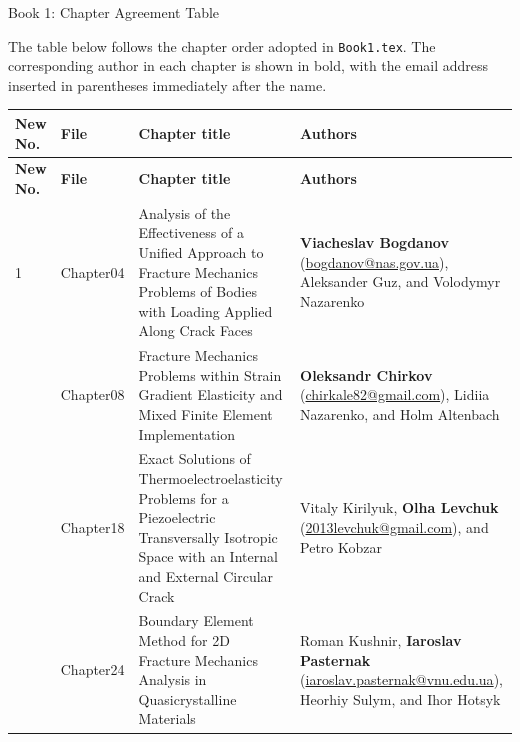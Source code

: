 \documentclass[12pt,a4paper]{article}
\begin{document}
	
	\begin{center}
		{\LARGE Book 1: Chapter Agreement Table}
	\end{center}
	
	\bigskip
	
	\noindent
	The table below follows the chapter order adopted in \texttt{Book1.tex}. The corresponding author in each chapter is shown in bold, with the email address inserted in parentheses immediately after the name.
	
	\renewcommand{\arraystretch}{1.5}
	\setlength{\LTleft}{0pt}
	\setlength{\LTright}{0pt}
	
	\begin{longtable}{>{\RaggedRight\arraybackslash}p{1.1cm} >{\RaggedRight\arraybackslash}p{1.8cm} >{\RaggedRight\arraybackslash}p{6.4cm} >{\RaggedRight\arraybackslash}p{5.9cm}}
		\toprule
		\textbf{New No.} & \textbf{File} & \textbf{Chapter title} & \textbf{Authors} \\
		\midrule
		\endfirsthead
		
		\toprule
		\textbf{New No.} & \textbf{File} & \textbf{Chapter title} & \textbf{Authors} \\
		\midrule
		\endhead
		
		\bottomrule
		\endfoot
		
		1 & Chapter04 & Analysis of the Effectiveness of a Unified Approach to Fracture Mechanics Problems of Bodies with Loading Applied Along Crack Faces & \textbf{Viacheslav Bogdanov} (\href{mailto:bogdanov@nas.gov.ua}{bogdanov@nas.gov.ua}), Aleksander Guz, and Volodymyr Nazarenko \\
		
		2 & Chapter08 & Fracture Mechanics Problems within Strain Gradient Elasticity and Mixed Finite Element Implementation & \textbf{Oleksandr Chirkov} (\href{mailto:chirkale82@gmail.com}{chirkale82@gmail.com}), Lidiia Nazarenko, and Holm Altenbach \\
		
		3 & Chapter18 & Exact Solutions of Thermoelectroelasticity Problems for a Piezoelectric Transversally Isotropic Space with an Internal and External Circular Crack & Vitaly Kirilyuk, \textbf{Olha Levchuk} (\href{mailto:2013levchuk@gmail.com}{2013levchuk@gmail.com}), and Petro Kobzar \\
		
		4 & Chapter24 & Boundary Element Method for 2D Fracture Mechanics Analysis in Quasicrystalline Materials & Roman Kushnir, \textbf{Iaroslav Pasternak} (\href{mailto:iaroslav.pasternak@vnu.edu.ua}{iaroslav.pasternak@vnu.edu.ua}), Heorhiy Sulym, and Ihor Hotsyk \\
		

\end{longtable}
\end{document}
